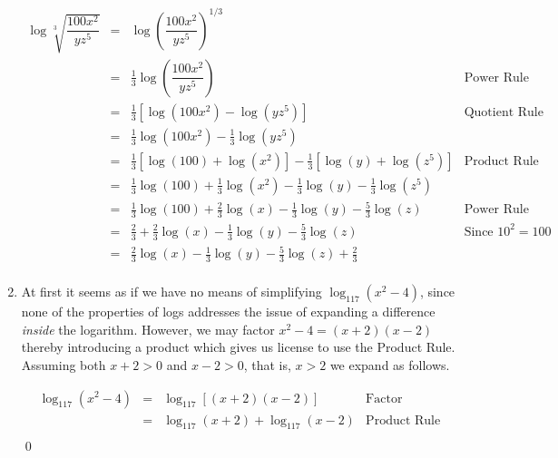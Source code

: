 \documentclass{ximera}
\begin{document}
\begin{ex}
\begin{enumerate}
\[\begin{array}{rclr}
\log \sqrt[3]{\dfrac{100 x^2}{yz^5}} & = & \log \left(\dfrac{100 x^2}{yz^5}\right)^{1/3} & \\ [10pt]
																		& = & \frac{1}{3} \log\left(\dfrac{100 x^2}{yz^5}\right) & \mbox{Power Rule} \\ [5pt]
																		& = & \frac{1}{3} \left[ \log\left(100x^2\right) - \log\left(yz^5\right) \right] & \mbox{Quotient Rule} \\ 
																		& = & \frac{1}{3}\log\left(100x^2\right) - \frac{1}{3}\log\left(yz^5\right) & \\
																		& = & \frac{1}{3}\left[ \log(100) + \log\left(x^2\right)\right] - \frac{1}{3} \left[ \log(y) + \log\left(z^5\right) \right] & \mbox{Product Rule} \\
																		& = & \frac{1}{3} \log(100) + \frac{1}{3} \log\left(x^2\right) - \frac{1}{3} \log(y) - \frac{1}{3} \log\left(z^5\right) \\
																		& = & \frac{1}{3} \log(100) + \frac{2}{3} \log(x) - \frac{1}{3} \log(y) - \frac{5}{3} \log(z) & \mbox{Power Rule} \\
																		& = & \frac{2}{3} + \frac{2}{3} \log(x) - \frac{1}{3} \log(y) - \frac{5}{3} \log(z) & \mbox{Since $10^2=100$} \\
																		& = &  \frac{2}{3} \log(x) - \frac{1}{3} \log(y) - \frac{5}{3} \log(z) + \frac{2}{3} & \\


\end{array} \]
\setlength{\extrarowheight}{2pt}

\item  At first it seems as if we have no means of simplifying $\log_{117}\left(x^2-4\right)$, since none of the properties of logs addresses the issue of expanding a difference \textit{inside} the logarithm.  However, we may factor $x^2 - 4 = (x+2)(x-2)$ thereby introducing a product which gives us license to use the Product Rule.  Assuming both $x+2>0$ and $x-2>0$, that is, $x >2$  we expand as follows.

\setlength{\extrarowheight}{4pt}
\[ \begin{array}{rclr}

\log_{117}\left(x^2-4\right) & = & \log_{117} \left[(x+2)(x-2)\right] & \mbox{Factor} \\
														 & = & \log_{117}(x+2) + \log_{117}(x-2) & \mbox{Product Rule} \\
\end{array}\]
\setlength{\extrarowheight}{2pt}
\qed

\end{enumerate}

\end{ex}
\end{document}
